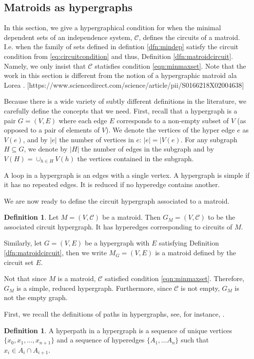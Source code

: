 \documentclass[11pt]{article}
\newcommand{\sC}{\mathscr{C}}
\theoremstyle{remark}
\theoremstyle{definition}
\newtheorem{dfn}[thm]{Definition}
\begin{document}
\subsection{Matroids as hypergraphs \label{sec:matroidhypergraph}}

In this section, we give a hypergraphical condition for when the minimal dependent sets of an independence system, $\sC$, defines the circuits of a matroid. I.e. when the family of sets defined in defintion \ref{dfn:mindep} satisfy the circuit condition from \eqref{eq:circuitcondition} and thus, Definition \ref{dfn:matroidcircuit}. Namely, we only insist that $\sC$ statisfies condition \eqref{eqn:minmaxset}. Note that the work in this section is different from the notion of a hypergraphic matroid ala Lorea \cite{1975_paper}. [https://www.sciencedirect.com/science/article/pii/S0166218X02004638]

Because there is a wide variety of subtly different definitions in the literature, we carefully define the concepts that we need. First, recall that a hypergraph is a pair $G = (V, E)$ where each edge $E$ corresponds to a non-empty subset of $V$ (as opposed to a pair of elements of $V$). We denote the vertices of the hyper edge $e$ as $V(e)$, and by $|e|$ the number of vertices in $e$: $|e| = |V(e)$. For any subgraph $H \subseteq G$, we denote by $|H|$ the number of edges in the subgraph and by $V(H) = \cup_{h \in H} V(h)$ the vertices contained in the subgraph. 

A loop in a hypergraph is an edges with a single vertex. A hypergraph is simple if it has no repeated edges. It is reduced if no hyperedge contains another.

We are now ready to define the circuit hypergraph associated to a matroid.
\begin{dfn}\label{dfn:circuithypergraph}
	Let $M = (V, \sC)$ be a matroid. Then $G_M = (V, \sC)$ to be the associated circuit hypergraph. It has hyperedges corresponding to circuits of $M$.\end{dfn}

Similarly, let $G = (V, E)$ be a hypergraph with $E$ satisfying Definition \ref{dfn:matroidcircuit}, then we write $M_G = (V, E)$ is a matroid defined by the circuit set $E$. 

Not that since $M$ is a matroid, $\sC$ satisfied condition \eqref{eqn:minmaxset}. Therefore, $G_M$ is a simple, reduced hypergraph. Furthermore, since $\sC$ is not empty, $G_M$ is not the empty graph.

First, we recall the definitions of paths in hypergraphs, see, for instance, \cite{DirectedHypergraphs}.
\begin{dfn} \label{dfn:hypergraphpaths}
A hyperpath in a hypergraph is a sequence of unique vertices $\{x_0, x_1, \ldots , x_{n+1}\}$ and a sequence of hyperedges $\{A_1, \ldots A_n\}$ such that $x_i \in A_i \cap A_{i+1}$. 
\end{dfn}
\end{document}
